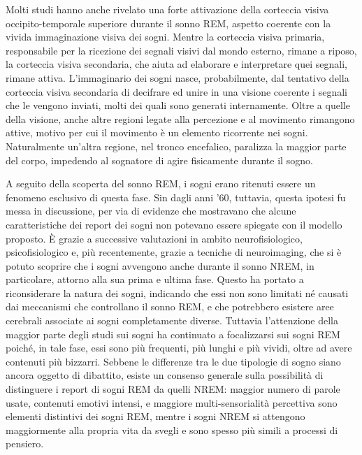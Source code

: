 Molti studi hanno anche rivelato una forte attivazione della corteccia visiva occipito-temporale superiore durante
il sonno REM, aspetto coerente con la vivida immaginazione visiva dei sogni.
Mentre la corteccia visiva primaria, responsabile per la ricezione dei segnali visivi dal mondo esterno, rimane a
riposo, la corteccia visiva secondaria, che aiuta ad elaborare e interpretare quei segnali, rimane attiva.
L'immaginario dei sogni nasce, probabilmente, dal tentativo della corteccia visiva secondaria di decifrare ed unire in
una visione coerente i segnali che le vengono inviati, molti dei quali sono generati internamente.
Oltre a quelle della visione, anche altre regioni legate alla percezione e al movimento rimangono attive, motivo
per cui il movimento è un elemento ricorrente nei sogni.
Naturalmente un'altra regione, nel tronco encefalico, paralizza la maggior parte del corpo, impedendo al sognatore di
agire fisicamente durante il sogno.


A seguito della scoperta del sonno REM, i sogni erano ritenuti essere un fenomeno esclusivo di questa fase.
Sin dagli anni '60, tuttavia, questa ipotesi fu messa in discussione, per via di evidenze che mostravano che
alcune caratteristiche dei report dei sogni non potevano essere spiegate con il modello proposto.
\`E grazie a successive valutazioni in ambito neurofisiologico, psicofisiologico e, più recentemente,
grazie a tecniche di neuroimaging, che si è potuto scoprire che i sogni avvengono anche durante il sonno NREM,
in particolare, attorno alla sua prima e ultima fase. %
Questo ha portato a riconsiderare la natura dei sogni, indicando che essi non sono limitati né causati dai meccanismi
che controllano il sonno REM, e che potrebbero esistere aree cerebrali associate ai sogni completamente diverse.
Tuttavia l'attenzione della maggior parte degli studi sui sogni ha continuato a focalizzarsi sui sogni REM poiché,
in tale fase, essi sono più frequenti, più lunghi e più vividi, oltre ad avere contenuti più bizzarri.
Sebbene le differenze tra le due tipologie di sogno siano ancora oggetto di dibattito, esiste un consenso generale
sulla possibilità di distinguere i report di sogni REM da quelli NREM: maggior numero di parole usate,
contenuti emotivi intensi, e maggiore multi-sensorialità percettiva sono elementi distintivi dei sogni REM,
mentre i sogni NREM si attengono maggiormente alla propria vita da svegli e sono spesso più simili a
processi di pensiero.
\newpage

